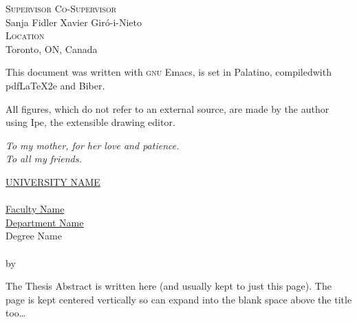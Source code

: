 \noindent \textsc{Supervisor} \hfill \textsc{Co-Supervisor} \\
Sanja Fidler \hfill Xavier Giró-i-Nieto \\

\noindent \textsc{Location} \\
Toronto, ON, Canada \\

\doclicenseThis









This document was written with \textsc{gnu} Emacs, is set in Palatino,
compiledwith pdf\LaTeX{}2e and Biber.

All figures, which do not refer to an external
source, are made by the author using Ipe, the extensible drawing editor.









































\cleardoublepage
\thispagestyle{empty}
\begin{flushright}
  \itshape
  To my mother, for her love and patience. \\
  To all my friends.
\end{flushright}


\cleardoublepage
\thispagestyle{plain}
\null
\vfill
\begin{center}
  \makeatletter
  \MakeUppercase{\href{https://href.com}{University Name}} \\
  \vspace{20pt}
  {\huge \textit{\abstractname}} \\
  \bigskip
  \href{https://href.com}{Faculty Name} \\
  \href{https://href.com}{Department Name} \\
  \bigskip
  Degree Name \\
  \bigskip
  \textbf{\@title} \\
  \medskip
  by \@author \\
  \bigskip
  \makeatother
\end{center}
The Thesis Abstract is written here (and usually kept to just this page). The
page is kept centered vertically so can expand into the blank space above the
title too\ldots
\vfill
\null


